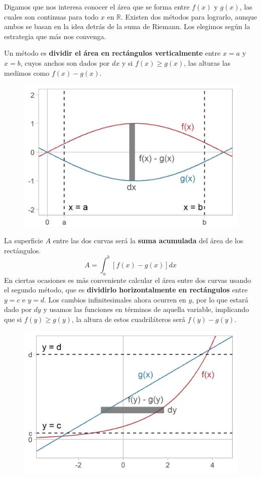 \documentclass[12pt]{article}
\begin{document}
Digamos que nos interesa conocer el área que se forma entre $f(x)$ y $g(x)$, las cuales son continuas para todo $x$ en $\mathbb{R}$. Existen dos métodos para lograrlo, aunque ambos se basan en la idea detrás de la suma de Riemann. Los elegimos según la estrategia que más nos convenga.

Un método es \textbf{dividir el área en rectángulos verticalmente} entre $x = a$ y $x = b$, cuyos anchos son dados por $dx$ y si $f(x) \geq g(x)$, las alturas las medimos como $f(x) - g(x)$.

\newpage

\begin{figure}[hbt!]
\centering
\includegraphics[scale=0.7]{img/first_method.jpg}
\end{figure}

La superficie $A$ entre las dos curvas será la \textbf{suma acumulada} del área de los rectángulos.
\[
  A = \int_{a}^{b} [f(x) - g(x)] dx
\]
En ciertas ocasiones es más conveniente calcular el área entre dos curvas usando el segundo método, que es \textbf{dividirlo horizontalmente en rectángulos} entre $y = c$ e $y = d$. Los cambios infinitesimales ahora ocurren en $y$, por lo que estará dado por $dy$ y usamos las funciones en términos de aquella variable, implicando que si $f(y) \geq g(y)$, la altura de estos cuadriláteros será $f(y) - g(y)$.

\begin{figure}[hbt!]
\centering
\includegraphics[scale=0.7]{img/second_method.jpg}
\end{figure}
\end{document}
